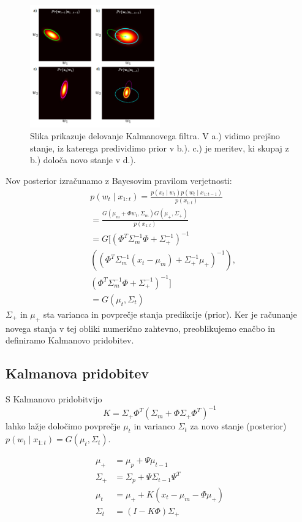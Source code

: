 \documentclass[a4paper]{article}
\begin{document}
\begin{figure}[h]
	\begin{center}
		\includegraphics [width=0.5\textwidth] {kalman.pdf}
	\end{center}
	\caption{Slika prikazuje delovanje Kalmanovega filtra. V a.) vidimo prejšno stanje, iz katerega predividimo prior v b.). c.) je meritev, ki skupaj z b.) določa novo stanje v d.).}
	\label{kalman}
\end{figure}

Nov posterior izračunamo z Bayesovim pravilom verjetnosti:
\begin{align*}
&p(w_t\mid x_{1:t}) = \frac{p(x_t\mid w_t)p(w_{t}\mid x_{1:t-1})}{p(x_{1:t})}\\
&=\frac{G(\mu_m + \Phi w_t, \Sigma_m)G(\mu_+, \Sigma_+)}{p(x_{1:t})}\\
&=G[(\Phi^T \Sigma_m^{-1} \Phi+\Sigma_+^{-1})^{-1}\\
&((\Phi^T \Sigma_m^{-1}(x_t-\mu_m)+\Sigma_+^{-1}\mu_+)^{-1}),\\
&(\Phi^T \Sigma_m^{-1} \Phi+\Sigma_+^{-1})^{-1}]\\
&=G(\mu_t, \Sigma_t)
\end{align*}
$\Sigma_+$ in $\mu_+$ sta varianca in povprečje stanja predikcije (prior). Ker je računanje novega stanja v tej obliki numerično zahtevno, preoblikujemo enačbo in definiramo Kalmanovo pridobitev.

\subsection{Kalmanova pridobitev}
S Kalmanovo pridobitvijo 
$$K = \Sigma_+ \Phi^T(\Sigma_m + \Phi \Sigma_+\Phi^T)^{-1}$$ 
lahko lažje določimo povprečje $\mu_t$ in varianco $\Sigma_t$ za novo stanje (posterior) $p(w_t\mid x_{1:t}) = G(\mu_t, \Sigma_t)$. 

\begin{align*}
\mu_+ &= \mu_p+\Psi\mu_{t-1}\\
\Sigma_+ &= \Sigma_p + \Psi\Sigma_{t-1}\Psi^T\\
\mu_t &= \mu_+ + K(x_t - \mu_m - \Phi\mu_+)\\
\Sigma_t &= (I - K\Phi)\Sigma_+
\end{align*}
\end{document}
